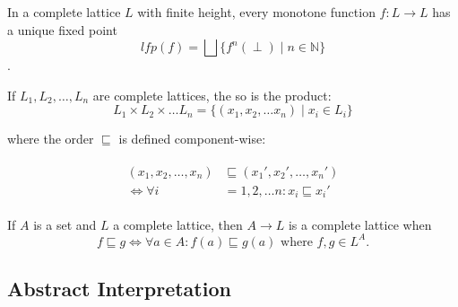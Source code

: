 \begin{theorem}\label{thm:kleene_finite}
    In a complete lattice $L$ with finite height, every monotone function $f : L \rightarrow L$ has a unique fixed point
    \begin{equation*}
        lfp(f) = \bigsqcup\{f^n(\perp) \mid n \in \mathbb{N}\}
    \end{equation*}.
\end{theorem}




\begin{theorem}
    If $L_1, L_2, \dots, L_n$ are complete lattices, the so is the product:
    \begin{equation*}
        L_1 \times L_2 \times \dots L_n = \{(x_1, x_2, \dots x_n) \mid x_i \in L_i\}
    \end{equation*}

    where the order $\sqsubseteq$ is defined component-wise:

    \begin{align*}
        \begin{split}
        (x_1, x_2, \dots, x_n) &\sqsubseteq (x_1', x_2', \dots, x_n') \\
        \iff
        \forall i &= 1, 2, \dots n : x_i \sqsubseteq x_i'
        \end{split}
    \end{align*}
\end{theorem}

\begin{theorem}
    If $A$ is a set and $L$ a complete lattice, then $A \rightarrow L$ is a complete lattice when
    \begin{equation}
        f \sqsubseteq g \iff \forall a \in A : f(a) \sqsubseteq g(a) \text{ where } f,g \in L^A.\label{eq:equation-complete-lattice-theorem}
    \end{equation}

\end{theorem}


\subsection{Abstract Interpretation}\label{subsec:abstract-interpretation}

